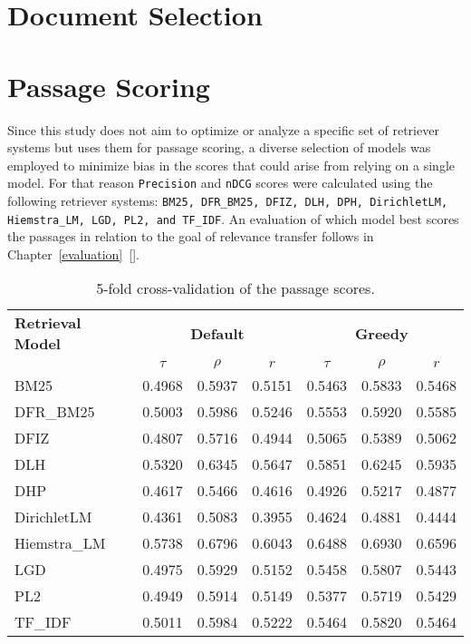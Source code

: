 \section{Document Selection}\label{eval-doucment-selection}

\section{Passage Scoring}\label{eval-passage-scoring}

Since this study does not aim to optimize or analyze a specific set of retriever systems but uses them for passage scoring, a diverse selection of models was employed to minimize bias in the scores that could arise from relying on a single model. For that reason \texttt{Precision} and \texttt{nDCG} scores were calculated using the following retriever systems: \texttt{BM25, DFR\_BM25, DFIZ, DLH, DPH, DirichletLM, Hiemstra\_LM, LGD, PL2, and TF\_IDF}. An evaluation of which model best scores the passages in relation to the goal of relevance transfer follows in Chapter~\ref{evaluation}~[].

\begin{table}[h!]
    \centering
    \caption{5-fold cross-validation of the passage scores.}
    \begin{tabular}{lcccccc}
        \toprule
        \textbf{Retrieval Model} & \multicolumn{3}{c}{\textbf{Default}} & \multicolumn{3}{c}{\textbf{Greedy}} \\
        \cmidrule(lr){2-4} \cmidrule(lr){5-7}
                                 & $\tau$ & $\rho$ & $r$ & $\tau$ & $\rho$ & $r$ \\
        \midrule

        BM25         & 0.4968 & 0.5937 & 0.5151 & 0.5463 & 0.5833 & 0.5468 \\
        DFR\_BM25    & 0.5003 & 0.5986 & 0.5246 & 0.5553 & 0.5920 & 0.5585 \\
        DFIZ         & 0.4807 & 0.5716 & 0.4944 & 0.5065 & 0.5389 & 0.5062 \\
        DLH          & 0.5320 & 0.6345 & 0.5647 & 0.5851 & 0.6245 & 0.5935 \\
        DHP          & 0.4617 & 0.5466 & 0.4616 & 0.4926 & 0.5217 & 0.4877 \\
        DirichletLM  & 0.4361 & 0.5083 & 0.3955 & 0.4624 & 0.4881 & 0.4444 \\
        Hiemstra\_LM & 0.5738 & 0.6796 & 0.6043 & 0.6488 & 0.6930 & 0.6596 \\
        LGD          & 0.4975 & 0.5929 & 0.5152 & 0.5458 & 0.5807 & 0.5443 \\
        PL2          & 0.4949 & 0.5914 & 0.5149 & 0.5377 & 0.5719 & 0.5429 \\
        TF\_IDF      & 0.5011 & 0.5984 & 0.5222 & 0.5464 & 0.5820 & 0.5464 \\
        \bottomrule
    \end{tabular}
\end{table}

